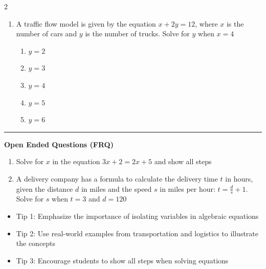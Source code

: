 \documentclass[10pt]{article}
\begin{document}
\begin{multicols}{2}
\begin{enumerate}[label=\textbf{Q\arabic*.}, leftmargin=*, itemsep=6pt, parsep=0pt]
  \item \small A traffic flow model is given by the equation $x + 2y = 12$, where $x$ is the number of cars and $y$ is the number of trucks. Solve for $y$ when $x = 4$
  \begin{enumerate}[label=(\Alph*), leftmargin=0.6cm, nosep, itemsep=2pt]
    \item $y = 2$
    \item $y = 3$
    \item $y = 4$
    \item $y = 5$
    \item $y = 6$
  \end{enumerate}

\end{enumerate}
\end{multicols}

\vspace{-0.2cm}
\hrule
\vspace{0.2cm}
\textbf{\small Open Ended Questions (FRQ)}
\begin{enumerate}[label=\textbf{Q\arabic*.}, start=9, itemsep=5pt, topsep=0pt]

  \item \small Solve for $x$ in the equation $3x + 2 = 2x + 5$ and show all steps \vspace{2cm}

  \item \small A delivery company has a formula to calculate the delivery time $t$ in hours, given the distance $d$ in miles and the speed $s$ in miles per hour: $t = \frac{d}{s} + 1$. Solve for $s$ when $t = 3$ and $d = 120$ \vspace{2cm}

\end{enumerate}

\vfill

\begin{tcolorbox}[colback=blue!5, colframe=mainblue!50, title=\small \textbf{Chef's Tips}, fonttitle=\bfseries, bottom=1mm]
\begin{itemize}[noitemsep, topsep=2pt, leftmargin=0.5cm]
  \item \scriptsize Tip 1: Emphasize the importance of isolating variables in algebraic equations\item \scriptsize Tip 2: Use real-world examples from transportation and logistics to illustrate the concepts\item \scriptsize Tip 3: Encourage students to show all steps when solving equations
\end{itemize}
\end{tcolorbox}
\end{document}

